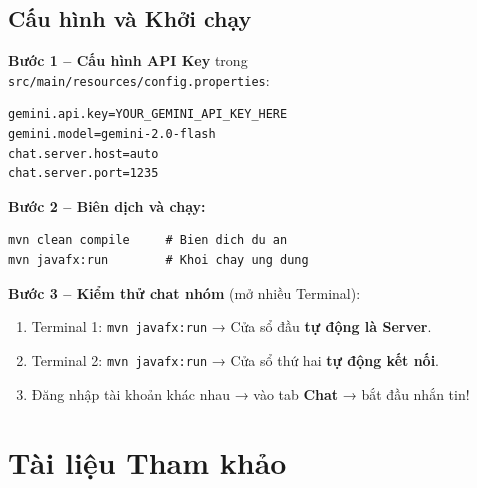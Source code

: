 \documentclass[12pt, a4paper, oneside]{report}
\newcommand{\code}[1]{\texttt{\color{hustblue!80!black}#1}}
\begin{document}
\section{Cấu hình và Khởi chạy}

\textbf{Bước 1 -- Cấu hình API Key} trong
\code{src/main/resources/config.properties}:

\begin{tcolorbox}[codestyle]
\begin{lstlisting}[style=bashstyle, numbers=none]
gemini.api.key=YOUR_GEMINI_API_KEY_HERE
gemini.model=gemini-2.0-flash
chat.server.host=auto
chat.server.port=1235
\end{lstlisting}
\end{tcolorbox}

\textbf{Bước 2 -- Biên dịch và chạy:}

\begin{tcolorbox}[codestyle]
\begin{lstlisting}[style=bashstyle, numbers=none]
mvn clean compile     # Bien dich du an
mvn javafx:run        # Khoi chay ung dung
\end{lstlisting}
\end{tcolorbox}

\textbf{Bước 3 -- Kiểm thử chat nhóm} (mở nhiều Terminal):

\begin{enumerate}[leftmargin=2em, itemsep=4pt]
  \item Terminal 1: \code{mvn javafx:run} → Cửa sổ đầu \textbf{tự động là Server}.
  \item Terminal 2: \code{mvn javafx:run} → Cửa sổ thứ hai \textbf{tự động kết nối}.
  \item Đăng nhập tài khoản khác nhau → vào tab \textbf{Chat} → bắt đầu nhắn tin!
\end{enumerate}

\chapter{Tài liệu Tham khảo}
\end{document}
